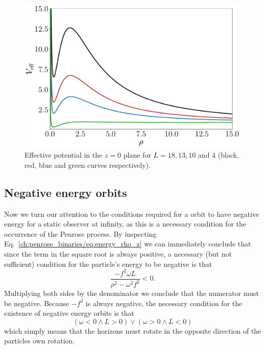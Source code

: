 \begin{figure}
  \centering
  \includegraphics[scale = 0.3]{img/penrose_binaries/cmmr_vEff.pdf}
  \caption{Effective potential in the $z=0$ plane for $L=18,13,10$ and $4$ (black, red, blue and green curves respectively).}
  \label{ch:penrose_binaries/fig:effective_potential}
\end{figure}

\subsection{Negative energy orbits}

Now we turn our attention to the conditions required for a orbit to have negative energy for a static observer at infinity, as this is a necessary condition for the occurrence of the Penrose process. By inspecting Eq.~\eqref{ch:penrose_binaries/eq:energy_rho_z} we can immediately conclude that since the term in the square root is always positive, a necessary (but not sufficient) condition for the particle's energy to be negative is that
%
\begin{equation}
  \frac{-f^2\omega L}{\rho^2 - \omega^2 f^2} < 0.
  \label{ch:penrose_binaries/eq:necessary_condition}
\end{equation}
%
Multiplying both sides by the denominator we conclude that the numerator must be negative. Because $-f^2$ is always negative, the necessary condition for the existence of negative energy orbits is that
%
\begin{equation}
  (\omega < 0 \land L > 0) \lor (\omega > 0 \land L < 0)
\end{equation}
%
which simply means that the horizons must rotate in the opposite direction of the particles own rotation.


